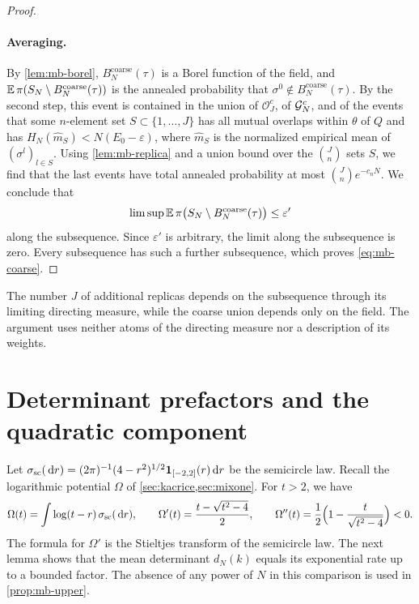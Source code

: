 \begin{proof}
\paragraph{Averaging.}
By \cref{lem:mb-borel}, $B^{\mathrm{coarse}}_N(\tau)$ is a Borel function of the field, and $\mathbb E\,\pi(S_N\setminus B^{\mathrm{coarse}}_N(\tau))$ is the annealed probability that $\sigma^0\notin B^{\mathrm{coarse}}_N(\tau)$. By the second step, this event is contained in the union of $\mathcal O_J^c$, of $\mathcal G_N^c$, and of the events that some $n$-element set $S\subset\{1,\dots,J\}$ has all mutual overlaps within $\theta$ of $Q$ and has $H_N(\widehat m_S)<N(E_0-\varepsilon)$, where $\widehat m_S$ is the normalized empirical mean of $(\sigma^l)_{l\in S}$. Using \cref{lem:mb-replica} and a union bound over the $\binom Jn$ sets $S$, we find that the last events have total annealed probability at most $\binom Jne^{-c_nN}$. We conclude that
\[
\limsup\mathbb E\,\pi\bigl(S_N\setminus B^{\mathrm{coarse}}_N(\tau)\bigr)\le\varepsilon'
\]
along the subsequence. Since $\varepsilon'$ is arbitrary, the limit along the subsequence is zero. Every subsequence has such a further subsequence, which proves \eqref{eq:mb-coarse}.
\end{proof}

The number $J$ of additional replicas depends on the subsequence through its limiting directing measure, while the coarse union depends only on the field. The argument uses neither atoms of the directing measure nor a description of its weights.

\section{Determinant prefactors and the quadratic component}\label{sec:mb-prefactor}

Let $\sigma_{\mathrm{sc}}(\,\mathrm d r)=(2\pi)^{-1}(4-r^2)^{1/2}\mathbf 1_{[-2,2]}(r)\,\mathrm d r$ be the semicircle law. Recall the logarithmic potential $\Omega$ of \cref{sec:kacrice,sec:mixone}. For $t>2$, we have
\begin{equation}\label{eq:mb-Omega}
\Omega(t)=\int\log(t-r)\,\sigma_{\mathrm{sc}}(\,\mathrm d r),\qquad \Omega'(t)=\frac{t-\sqrt{t^2-4}}2,\qquad \Omega''(t)=\frac12\Bigl(1-\frac t{\sqrt{t^2-4}}\Bigr)<0 .
\end{equation}
The formula for $\Omega'$ is the Stieltjes transform of the semicircle law. The next lemma shows that the mean determinant $d_N(k)$ equals its exponential rate up to a bounded factor. The absence of any power of $N$ in this comparison is used in \cref{prop:mb-upper}.

